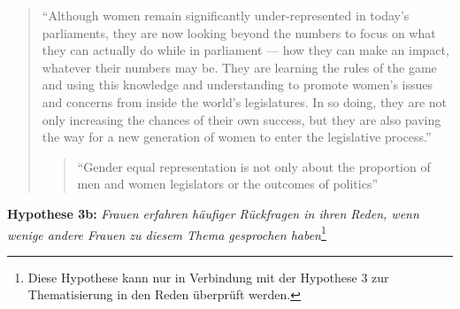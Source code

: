 \documentclass[12pt, 
    twoside=false, 
    bibliography=totoc, 
    numbers=endperiod, 
    headings=normal, 
    toc=chapterentrydotfill
    ]{scrbook}
\begin{document}
\begin{quote}
    \enquote{Although women remain significantly under-represented in today’s parliaments, they are now looking beyond the numbers to focus on what they can actually do while in parliament — how they can make an impact, whatever their numbers may be. They are learning the rules of the game and using this knowledge and understanding to promote women’s issues and concerns from inside the world’s legislatures. In so doing, they are not only increasing the chances of their own success, but they are also paving the way for a new generation of women to enter the legislative process.} \parencite[3]{lovenduski_2015}
    
    
    \citereset
\begin{quote}
    \enquote{Gender equal representation is not only about the proportion of men and women legislators or the outcomes of politics}\parencite[197]{erikson_2018}
\end{quote}



\end{quote}
\textbf{Hypothese 3b:} \emph{Frauen erfahren häufiger Rückfragen in ihren Reden, wenn wenige andere Frauen zu diesem Thema gesprochen haben}\footnote{Diese Hypothese kann nur in Verbindung mit der Hypothese 3 zur Thematisierung in den Reden überprüft werden.}

\printbibliography[title={Literaturverzeichnis}]
\end{document}
